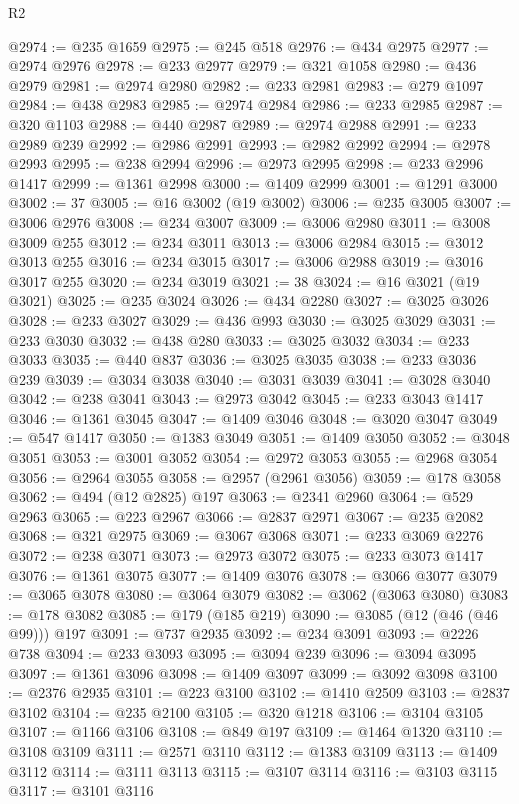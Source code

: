 \begin{lexlean}{R2}
\begin{coremodule}
@2974 := @235 @1659
@2975 := @245 @518
@2976 := @434 @2975
@2977 := @2974 @2976
@2978 := @233 @2977
@2979 := @321 @1058
@2980 := @436 @2979
@2981 := @2974 @2980
@2982 := @233 @2981
@2983 := @279 @1097
@2984 := @438 @2983
@2985 := @2974 @2984
@2986 := @233 @2985
@2987 := @320 @1103
@2988 := @440 @2987
@2989 := @2974 @2988
@2991 := @233 @2989 @239
@2992 := @2986 @2991
@2993 := @2982 @2992
@2994 := @2978 @2993
@2995 := @238 @2994
@2996 := @2973 @2995
@2998 := @233 @2996 @1417
@2999 := @1361 @2998
@3000 := @1409 @2999
@3001 := @1291 @3000
@3002 := 37
@3005 := @16 @3002 (@19 @3002)
@3006 := @235 @3005
@3007 := @3006 @2976
@3008 := @234 @3007
@3009 := @3006 @2980
@3011 := @3008 @3009 @255
@3012 := @234 @3011
@3013 := @3006 @2984
@3015 := @3012 @3013 @255
@3016 := @234 @3015
@3017 := @3006 @2988
@3019 := @3016 @3017 @255
@3020 := @234 @3019
@3021 := 38
@3024 := @16 @3021 (@19 @3021)
@3025 := @235 @3024
@3026 := @434 @2280
@3027 := @3025 @3026
@3028 := @233 @3027
@3029 := @436 @993
@3030 := @3025 @3029
@3031 := @233 @3030
@3032 := @438 @280
@3033 := @3025 @3032
@3034 := @233 @3033
@3035 := @440 @837
@3036 := @3025 @3035
@3038 := @233 @3036 @239
@3039 := @3034 @3038
@3040 := @3031 @3039
@3041 := @3028 @3040
@3042 := @238 @3041
@3043 := @2973 @3042
@3045 := @233 @3043 @1417
@3046 := @1361 @3045
@3047 := @1409 @3046
@3048 := @3020 @3047
@3049 := @547 @1417
@3050 := @1383 @3049
@3051 := @1409 @3050
@3052 := @3048 @3051
@3053 := @3001 @3052
@3054 := @2972 @3053
@3055 := @2968 @3054
@3056 := @2964 @3055
@3058 := @2957 (@2961 @3056)
@3059 := @178 @3058
@3062 := @494 (@12 @2825) @197
@3063 := @2341 @2960
@3064 := @529 @2963
@3065 := @223 @2967
@3066 := @2837 @2971
@3067 := @235 @2082
@3068 := @321 @2975
@3069 := @3067 @3068
@3071 := @233 @3069 @2276
@3072 := @238 @3071
@3073 := @2973 @3072
@3075 := @233 @3073 @1417
@3076 := @1361 @3075
@3077 := @1409 @3076
@3078 := @3066 @3077
@3079 := @3065 @3078
@3080 := @3064 @3079
@3082 := @3062 (@3063 @3080)
@3083 := @178 @3082
@3085 := @179 (@185 @219)
@3090 := @3085 (@12 (@46 (@46 @99))) @197
@3091 := @737 @2935
@3092 := @234 @3091
@3093 := @2226 @738
@3094 := @233 @3093
@3095 := @3094 @239
@3096 := @3094 @3095
@3097 := @1361 @3096
@3098 := @1409 @3097
@3099 := @3092 @3098
@3100 := @2376 @2935
@3101 := @223 @3100
@3102 := @1410 @2509
@3103 := @2837 @3102
@3104 := @235 @2100
@3105 := @320 @1218
@3106 := @3104 @3105
@3107 := @1166 @3106
@3108 := @849 @197
@3109 := @1464 @1320
@3110 := @3108 @3109
@3111 := @2571 @3110
@3112 := @1383 @3109
@3113 := @1409 @3112
@3114 := @3111 @3113
@3115 := @3107 @3114
@3116 := @3103 @3115
@3117 := @3101 @3116

\end{coremodule}
\end{lexlean}
